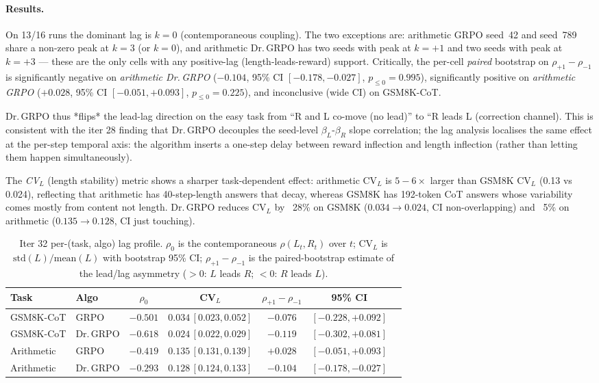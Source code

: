 \paragraph{Results.}
On 13/16 runs the dominant lag is $k{=}0$ (contemporaneous coupling).
The two exceptions are: arithmetic GRPO seed~42 and seed~789 share a
non-zero peak at $k{=}3$ (or $k{=}0$), and arithmetic Dr.\,GRPO has two
seeds with peak at $k{=}{+}1$ and two seeds with peak at $k{=}{+}3$
--- these are the only cells with any positive-lag (length-leads-reward)
support. Critically, the per-cell \emph{paired} bootstrap on
$\rho_{+1} - \rho_{-1}$ is significantly negative on \emph{arithmetic
Dr.\,GRPO} ($-0.104$, 95\% CI $[-0.178, -0.027]$, $p_{\le 0}{=}0.995$),
significantly positive on \emph{arithmetic GRPO} ($+0.028$, 95\% CI
$[-0.051, +0.093]$, $p_{\le 0}{=}0.225$), and inconclusive (wide CI) on
GSM8K-CoT.

Dr.\,GRPO thus *flips* the lead-lag direction on the easy task from
``R and L co-move (no lead)'' to ``R leads L (correction channel).
This is consistent with the iter 28 finding that Dr.\,GRPO decouples
the seed-level $\beta_L$-$\beta_R$ slope correlation; the lag analysis
localises the same effect at the per-step temporal axis: the algorithm
inserts a one-step delay between reward inflection and length
inflection (rather than letting them happen simultaneously).

The \emph{CV}$_L$ (length stability) metric shows a sharper task-dependent
effect: arithmetic CV$_L$ is $5{-}6\times$ larger than GSM8K CV$_L$
(0.13 vs 0.024), reflecting that arithmetic has 40-step-length answers
that decay, whereas GSM8K has 192-token CoT answers whose variability
comes mostly from content not length. Dr.\,GRPO reduces CV$_L$ by
~28\% on GSM8K ($0.034 \to 0.024$, CI non-overlapping) and ~5\% on
arithmetic ($0.135 \to 0.128$, CI just touching).

\begin{table}[htbp]
\centering\small
\caption{Iter 32 per-(task, algo) lag profile. $\rho_0$ is the
contemporaneous $\rho(L_t,R_t)$ over $t$; CV$_L$ is $\mathrm{std}(L)/\mathrm{mean}(L)$
with bootstrap 95\% CI; $\rho_{+1}{-}\rho_{-1}$ is the paired-bootstrap
estimate of the lead/lag asymmetry ($>0$: $L$ leads $R$; $<0$: $R$
leads $L$).}
\label{tab:length-bias-iter32}
\begin{tabular}{llccccc}
\hline
Task & Algo & $\rho_0$ & CV$_L$ & $\rho_{+1}{-}\rho_{-1}$ & 95\% CI \\
\hline
GSM8K-CoT & GRPO & $-0.501$ & $0.034\,[0.023,0.052]$ & $-0.076$ & $[-0.228,+0.092]$ \\
GSM8K-CoT & Dr.\,GRPO & $-0.618$ & $0.024\,[0.022,0.029]$ & $-0.119$ & $[-0.302,+0.081]$ \\
Arithmetic & GRPO & $-0.419$ & $0.135\,[0.131,0.139]$ & $+0.028$ & $[-0.051,+0.093]$ \\
Arithmetic & Dr.\,GRPO & $-0.293$ & $0.128\,[0.124,0.133]$ & $-0.104$ & $[-0.178,-0.027]$ \\
\hline
\end{tabular}
\end{table}

